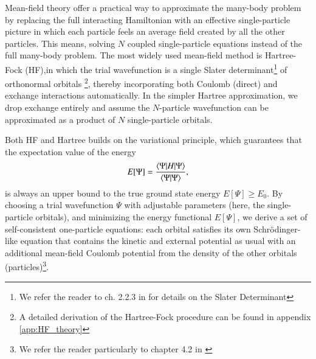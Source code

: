 \documentclass{subfiles}
\begin{document}
Mean-field theory offer a practical way to approximate the many-body problem by replacing the full interacting Hamiltonian with an effective single-particle picture in which each particle feels an average field created by all the other particles. This means, solving $N$ coupled single-particle equations instead of the full many-body problem. The most widely used mean-field method is Hartree-Fock (HF),in which the trial wavefunction is a single Slater determinant\footnote{We refer the reader to ch. 2.2.3 in \cite{szabo1996modern} for details on the Slater Determinant} of orthonormal orbitals \footnote{ A detailed derivation of the Hartree-Fock procedure can be found in appendix \ref{app:HF_theory}}, thereby incorporating both Coulomb (direct) and exchange interactions automatically. In the simpler Hartree approximation, we drop exchange entirely and assume the $N$-particle wavefunction can be approximated as a product of $N$ single-particle orbitals.

Both HF and Hartree builds on the variational principle, which guarantees that the expectation value of the energy
\begin{equation}
    E[\Psi] = \frac{\braket{\Psi|H|\Psi}}{\braket{\Psi|\Psi}}\label{eq:variational_principle},
\end{equation}
is always an upper bound to the true ground state energy $E[\Psi]\geq E_0$. By choosing a trial wavefunction $\Psi$ with adjustable parameters (here, the single-particle orbitals), and minimizing the energy functional $E[\Psi]$, we derive a set of self-consistent one-particle equations: each orbital satisfies its own Schrödinger-like equation that contains the kinetic and external potential as usual with an additional mean-field Coulomb potential from the density of the other orbitals (particles)\cite{helgaker2013molecular}\footnote{We refer the reader particularly to chapter 4.2 in \cite{helgaker2013molecular}}.
\end{document}
